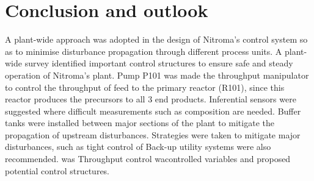 \section{Conclusion and outlook}
A plant-wide approach was adopted in the design of Nitroma's control system so as to minimise disturbance propagation through different process units. A plant-wide survey identified important control structures to ensure safe and steady operation of Nitroma's plant. Pump P101 was made the throughput manipulator to control the throughput of feed to the primary reactor (R101), since this reactor produces the precursors to all 3 end products. Inferential sensors were suggested where difficult measurements such as composition are needed. Buffer tanks were installed between major sections of the plant to mitigate the propagation of upstream disturbances. Strategies were taken to mitigate major disturbances, such as tight control of  Back-up utility systems were also recommended. was Throughput control wacontrolled variables and proposed potential control structures.